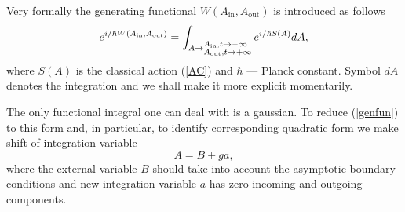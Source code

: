 \documentclass[12pt]{article}
\begin{document}
	Very formally the generating functional
    $ W(A_{\text{in}},A_{\text{out}}) $
	is introduced as follows
\begin{equation}
\label{genfun}
    e^{i/\hbar W(A_{\text{in}}, A_{\text{out}})} = \int_{A \to 
	    \begin{subarray}{l} 
		A_{\text{in}}, t \to - \infty \\
		A_{\text{out}}, t \to + \infty
	    \end{subarray}}
    e^{i/\hbar S(A)} d A ,
\end{equation}
	where
    $ S(A) $
	is the classical action
(\ref{AC})
	and
    $ \hbar $
	--- Planck constant.
	Symbol
    $ d A $
	denotes the integration and we shall make it more 
	explicit momentarily.

	The only functional integral one can deal with is a gaussian.
	To reduce
(\ref{genfun})
	to this form and, in particular, to identify corresponding quadratic
	form we make shift of integration variable
\begin{equation*}
    A = B + g a ,
\end{equation*}
	where the external variable
    $ B $ 
	should take into account the asymptotic boundary conditions 
	and new integration variable 
    $ a $
	has zero incoming and outgoing components.
\end{document}
